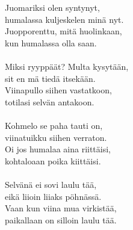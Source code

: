 
            Juomariksi olen syntynyt, \\
            humalassa kuljeskelen minä nyt. \\
            Juopporenttu, mitä huolinkaan, \\
            kun humalassa olla saan. \\
\hspace{10mm} \\
            Miksi ryyppäät? Multa kysytään, \\
            sit en mä tiedä itsekään. \\
            Viinapullo siihen vastatkoon, \\
            totilasi selvän antakoon. \\
\hspace{10mm} \\
            Kohmelo se paha tauti on, \\
            viinatuikku siihen verraton. \\
            Oi jos humalaa aina riittäisi, \\
            kohtaloaan poika kiittäisi. \\
\hspace{10mm} \\
            Selvänä ei sovi laulu tää, \\
            eikä liioin liiaks pöhnässä. \\
            Vaan kun viina mua virkistää, \\
            paikallaan on silloin laulu tää. \\
